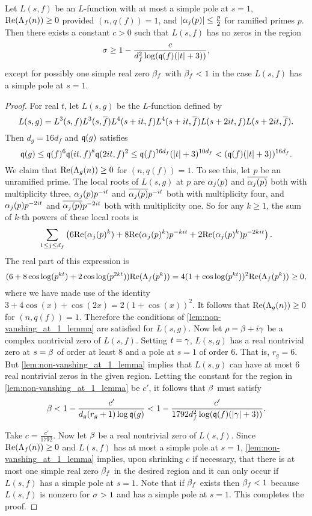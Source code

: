     \begin{theorem}\label{thm:zero_free_region_generic}
      Let $L(s,f)$ be an $L$-function with at most a simple pole at $s = 1$, $\mathrm{Re}(\Lambda_{f}(n)) \ge 0$ provided $(n,q(f)) = 1$, and $|\alpha_{j}(p)| \le \frac{p}{2}$ for ramified primes $p$. Then there exists a constant $c > 0$ such that $L(s,f)$ has no zeros in the region
      \[
        \sigma \ge 1-\frac{c}{d_{f}^{2}\log(\mathfrak{q}(f)(|t|+3))},
      \]
      except for possibly one simple real zero $\beta_{f}$ with $\beta_{f} < 1$ in the case $L(s,f)$ has a simple pole at $s = 1$.
    \end{theorem}
    \begin{proof}
      For real $t$, let $L(s,g)$ be the $L$-function defined by
      \[
        L(s,g) = L^{3}(s,f)L^{3}(s,\overline{f})L^{4}(s+it,f)L^{4}(s+it,\overline{f})L(s+2it,f)L(s+2it,\overline{f}).
      \]
      Then $d_{g} = 16d_{f}$ and $\mathfrak{q}(g)$ satisfies
      \[
        \mathfrak{q}(g) \le \mathfrak{q}(f)^{6}\mathfrak{q}(it,f)^{8}\mathfrak{q}(2it,f)^{2} \le \mathfrak{q}(f)^{16d_{f}}(|t|+3)^{10d_{f}} < (\mathfrak{q}(f)(|t|+3))^{16d_{f}}.
      \]
      We claim that $\mathrm{Re}(\Lambda_{g}(n)) \ge 0$ for $(n,q(f)) = 1$. To see this, let $p$ be an unramified prime. The local roots of $L(s,g)$ at $p$ are $\alpha_{j}(p)$ and $\overline{\alpha_{j}(p)}$ both with multiplicity three, $\alpha_{j}(p)p^{-it}$ and $\overline{\alpha_{j}(p)}p^{-it}$ both with multiplicity four, and $\alpha_{j}(p)p^{-2it}$ and $\overline{\alpha_{j}(p)}p^{-2it}$ both with multiplicity one. So for any $k \ge 1$, the sum of $k$-th powers of these local roots is
      \[
       \sum_{1 \le j \le d_{f}}\left(6\mathrm{Re}(\alpha_{j}(p)^{k})+8\mathrm{Re}(\alpha_{j}(p)^{k})p^{-kit}+2\mathrm{Re}(\alpha_{j}(p)^{k})p^{-2kit}\right).
      \]
      The real part of this expression is
      \[
         (6+8\cos\log(p^{kt})+2\cos\log(p^{2kt}))\mathrm{Re}(\Lambda_{f}(p^{k})) = 4(1+\cos\log(p^{kt}))^{2}\mathrm{Re}(\Lambda_{f}(p^{k})) \ge 0,
      \]
      where we have made use of the identity $3+4\cos(x)+\cos(2x) = 2(1+\cos(x))^{2}$. It follows that $\mathrm{Re}(\Lambda_{g}(n)) \ge 0$ for $(n,q(f)) = 1$. Therefore the conditions of \cref{lem:non-vanshing_at_1_lemma} are satisfied for $L(s,g)$. Now let $\rho = \beta+i\gamma$ be a complex nontrivial zero of $L(s,f)$. Setting $t = \gamma$, $L(s,g)$ has a real nontrivial zero at $s = \beta$ of order at least $8$ and a pole at $s = 1$ of order $6$. That is, $r_{g} = 6$. But \cref{lem:non-vanshing_at_1_lemma} implies that $L(s,g)$ can have at most $6$ real nontrivial zeros in the given region. Letting the constant for the region in \cref{lem:non-vanshing_at_1_lemma} be $c'$, it follows that $\beta$ must satisfy
      \[
        \beta < 1-\frac{c'}{d_{g}(r_{g}+1)\log{\mathfrak{q}(g)}} < 1-\frac{c'}{1792d_{f}^{2}\log(\mathfrak{q}(f)(|\gamma|+3))}.
      \]
  
      Take $c = \frac{c'}{1792}$. Now let $\beta$ be a real nontrivial zero of $L(s,f)$. Since $\mathrm{Re}(\Lambda_{f}(n)) \ge 0$ and $L(s,f)$ has at most a simple pole at $s = 1$, \cref{lem:non-vanshing_at_1_lemma} implies, upon shrinking $c$ if necessary, that there is at most one simple real zero $\beta_{f}$ in the desired region and it can only occur if $L(s,f)$ has a simple pole at $s = 1$. Note that if $\beta_{f}$ exists then $\beta_{f} < 1$ because $L(s,f)$ is nonzero for $\sigma > 1$ and has a simple pole at $s = 1$. This completes the proof.
    \end{proof}
    
